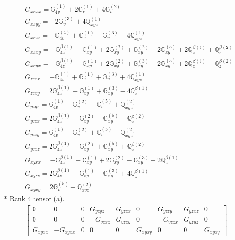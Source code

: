 \documentclass[fleqn,8pt,landscape]{jsarticle}
\begin{document}
\begin{align*}
& G_{xxxx} = \mathbb{G}_{4v}^{(1)} + 2 \mathbb{G}_{v}^{(1)} + 4 \mathbb{G}_{v}^{(2)} \\
& G_{xxyy} = - 2 \mathbb{G}_{v}^{(3)} + 4 \mathbb{Q}_{xyz}^{(1)} \\
& G_{xxzz} = - \mathbb{G}_{4v}^{(1)} + \mathbb{G}_{v}^{(1)} - \mathbb{G}_{v}^{(3)} - 4 \mathbb{Q}_{xyz}^{(1)} \\
& G_{xxxy} = - \mathbb{G}_{4z}^{\beta(1)} + \mathbb{G}_{xy}^{(1)} + 2 \mathbb{G}_{xy}^{(2)} + \mathbb{G}_{xy}^{(3)} - 2 \mathbb{G}_{xy}^{(5)} + 2 \mathbb{Q}_{z}^{\beta(1)} + \mathbb{Q}_{z}^{\beta(2)} \\
& G_{xxyx} = - \mathbb{G}_{4z}^{\beta(1)} + \mathbb{G}_{xy}^{(1)} + 2 \mathbb{G}_{xy}^{(2)} + \mathbb{G}_{xy}^{(3)} + 2 \mathbb{G}_{xy}^{(5)} + 2 \mathbb{Q}_{z}^{\beta(1)} - \mathbb{Q}_{z}^{\beta(2)} \\
& G_{zzxx} = - \mathbb{G}_{4v}^{(1)} + \mathbb{G}_{v}^{(1)} + \mathbb{G}_{v}^{(3)} + 4 \mathbb{Q}_{xyz}^{(1)} \\
& G_{zzxy} = 2 \mathbb{G}_{4z}^{\beta(1)} + \mathbb{G}_{xy}^{(1)} + \mathbb{G}_{xy}^{(3)} - 4 \mathbb{Q}_{z}^{\beta(1)} \\
& G_{yzyz} = \mathbb{G}_{4v}^{(1)} - \mathbb{G}_{v}^{(2)} - \mathbb{G}_{v}^{(5)} + \mathbb{Q}_{xyz}^{(2)} \\
& G_{yzzx} = 2 \mathbb{G}_{4z}^{\beta(1)} + \mathbb{G}_{xy}^{(2)} - \mathbb{G}_{xy}^{(5)} - \mathbb{Q}_{z}^{\beta(2)} \\
& G_{yzzy} = \mathbb{G}_{4v}^{(1)} - \mathbb{G}_{v}^{(2)} + \mathbb{G}_{v}^{(5)} - \mathbb{Q}_{xyz}^{(2)} \\
& G_{yzxz} = 2 \mathbb{G}_{4z}^{\beta(1)} + \mathbb{G}_{xy}^{(2)} + \mathbb{G}_{xy}^{(5)} + \mathbb{Q}_{z}^{\beta(2)} \\
& G_{xyxx} = - \mathbb{G}_{4z}^{\beta(1)} + \mathbb{G}_{xy}^{(1)} + 2 \mathbb{G}_{xy}^{(2)} - \mathbb{G}_{xy}^{(3)} - 2 \mathbb{Q}_{z}^{\beta(1)} \\
& G_{xyzz} = 2 \mathbb{G}_{4z}^{\beta(1)} + \mathbb{G}_{xy}^{(1)} - \mathbb{G}_{xy}^{(3)} + 4 \mathbb{Q}_{z}^{\beta(1)} \\
& G_{xyxy} = 2 \mathbb{G}_{v}^{(5)} + \mathbb{Q}_{xyz}^{(2)}
\end{align*}
* Rank 4 tensor (a).
\begin{align*}
\begin{bmatrix} 0 & 0 & 0 & G_{yzyz} & G_{yzzx} & 0 & G_{yzzy} & G_{yzxz} & 0 \\ 0 & 0 & 0 & - G_{yzxz} & G_{yzzy} & 0 & - G_{yzzx} & G_{yzyz} & 0 \\ G_{xyxx} & - G_{xyxx} & 0 & 0 & 0 & G_{xyxy} & 0 & 0 & G_{xyxy} \end{bmatrix}
\end{align*}
\end{document}
